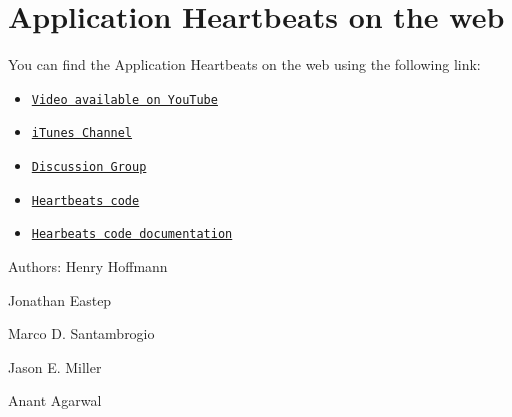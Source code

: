  \hypertarget{index_web}{}\section{Application Heartbeats on the web}\label{index_web}
You can find the Application Heartbeats on the web using the following link:\begin{itemize}
\item \href{http://www.youtube.com/user/hearbeatapi}{\tt Video available on YouTube}\item \href{http://itunes.apple.com/WebObjects/MZStore.woa/wa/viewPodcast?id=337587051}{\tt iTunes Channel}\item \href{http://groups.google.com/group/heartbeatsapi}{\tt Discussion Group}\item \href{http://code.google.com/p/heartbeats/}{\tt Heartbeats code}\item \href{https://groups.csail.mit.edu/carbon/heartbeats/}{\tt Hearbeats code documentation}\end{itemize}




 \begin{Desc}
\item[Authors:]Henry Hoffmann 

Jonathan Eastep 

Marco D. Santambrogio 

Jason E. Miller 

Anant Agarwal \end{Desc}
